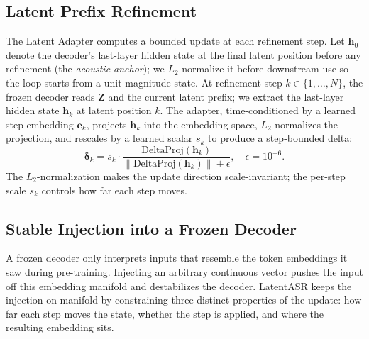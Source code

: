 \documentclass[a4paper]{article}
\newcommand{\method}{LatentASR}
\newcommand{\vdelta}{\boldsymbol{\delta}}
\begin{document}
\subsection{Latent Prefix Refinement}
\label{sec:refinement}

The Latent Adapter computes a bounded update at each refinement step. Let $\mathbf{h}_0$ denote the decoder's last-layer hidden state at the final latent position before any refinement (the \emph{acoustic anchor}); we $L_2$-normalize it before downstream use so the loop starts from a unit-magnitude state. At refinement step $k\in\{1,\dots,N\}$, the frozen decoder reads $\mathbf{Z}$ and the current latent prefix; we extract the last-layer hidden state $\mathbf{h}_k$ at latent position $k$. The adapter, time-conditioned by a learned step embedding $\mathbf{e}_k$, projects $\mathbf{h}_k$ into the embedding space, $L_2$-normalizes the projection, and rescales by a learned scalar $s_k$ to produce a step-bounded delta:
\begin{equation}
    \vdelta_k = s_k \cdot \frac{\text{DeltaProj}(\mathbf{h}_k)}{\lVert\text{DeltaProj}(\mathbf{h}_k)\rVert + \epsilon}, \quad \epsilon{=}10^{-6}.
    \label{eq:delta}
\end{equation}
The $L_2$-normalization makes the update direction scale-invariant; the per-step scale $s_k$ controls how far each step moves.

\subsection{Stable Injection into a Frozen Decoder}
\label{sec:injection}
\label{sec:stability}

A frozen decoder only interprets inputs that resemble the token embeddings it saw during pre-training. Injecting an arbitrary continuous vector pushes the input off this embedding manifold and destabilizes the decoder. \method{} keeps the injection on-manifold by constraining three distinct properties of the update: how far each step moves the state, whether the step is applied, and where the resulting embedding sits.
\end{document}
